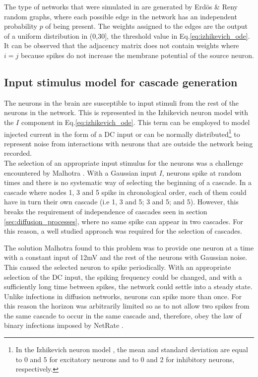 The type of networks that were simulated in \cite{alexandru2018estimating} are generated by Erdös \& Reny random graphs, where each possible edge in the network has an independent probability $p$ of being present. The weights assigned to the edges are the output of a uniform distribution in (0,30], the threshold value in Eq.\ref{eq:izhikevich_ode}. It can be observed that the adjacency matrix does not contain weights where $i=j$ because spikes do not increase the membrane potential of the source neuron.


\subsection{Input stimulus model for cascade generation}\label{sec:input_stimulus_model_for_cascade_generation}

The neurons in the brain are susceptible to input stimuli from the rest of the neurons in the network. This is represented in the Izhikevich neuron model with the $I$ component in Eq.\ref{eq:izhikevich_ode}. This term can be employed to model injected current in the form of a DC input or can be normally distributed\footnote{In the Izhikevich neuron model \cite{izhikevich2003simple}, the mean and standard deviation are equal to 0 and 5 for excitatory neurons and to 0 and 2 for inhibitory neurons, respectively.} to represent noise from interactions with neurons that are outside the network being recorded.\\

The selection of an appropriate input stimulus for the neurons was a challenge encountered by Malhotra \cite{alexandru2018estimating}. With a Gaussian input $I$, neurons spike at random times and there is no systematic way of selecting the beginning of a cascade. In a cascade where nodes 1, 3 and 5 spike in chronological order, each of them could have in turn their own cascade (i.e 1, 3 and 5; 3 and 5; and 5). However, this breaks the requirement of independence of cascades seen in section \ref{sec:diffusion_processes}, where no same spike can appear in two cascades. For this reason, a well studied approach was required for the selection of cascades. 

The solution Malhotra found to this problem was to provide one neuron at a time with a constant input of 12mV and the rest of the neurons with Gaussian noise. This caused the selected neuron to spike periodically. With an appropriate selection of the DC input, the spiking frequency could be changed, and with a sufficiently long time between spikes, the network could settle into a steady state. Unlike infections in diffusion networks, neurons can spike more than once. For this reason the horizon was arbitrarily limited so as to not allow two spikes from the same cascade to occur in the same cascade and, therefore, obey the law of binary infections imposed by NetRate \cite{alexandru2018estimating}.\\

